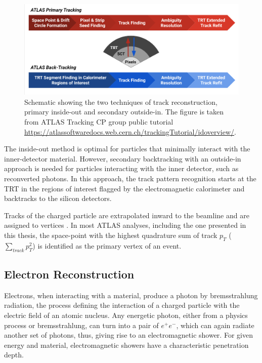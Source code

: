 \begin{figure}
    \centering
    \includegraphics[width=.9\linewidth]{figures/LHC/trackingflowchart.png}
    \caption{Schematic showing the two techniques of track reconstruction, primary inside-out and secondary outside-in. The figure is taken from ATLAS Tracking CP group public tutorial \url{https://atlassoftwaredocs.web.cern.ch/trackingTutorial/idoverview/}. \label{fig:TrackingOutline}}
\end{figure}

The inside-out method is optimal for particles that minimally interact with the inner-detector material. However, secondary backtracking with an outside-in approach is needed for particles interacting with the inner detector, such as reconverted photons. In this approach, the track pattern recognition starts at the TRT in the regions of interest flagged by the electromagnetic calorimeter and backtracks to the silicon detectors. 

Tracks of the charged particle are extrapolated inward to the beamline and are assigned to vertices \cite{VertexReconstruction}. In most ATLAS analyses, including the one presented in this thesis, the space-point with the highest quadrature sum of track $p_T$ ($\sum_{track}{p_{T}^2}$) is identified as the primary vertex of an event.

\subsection{Electron Reconstruction}
\label{subsec:ParticleRecon_Elec}
Electrons, when interacting with a material, produce a photon by bremsstrahlung radiation, the process defining the interaction of a charged particle with the electric field of an atomic nucleus. Any energetic photon, either from a physics process or bremsstrahlung, can turn into a pair of $e^{+}e^{-}$, which can again radiate another set of photons, thus, giving rise to an electromagnetic shower. For given energy and material, electromagnetic showers have a characteristic penetration depth.

